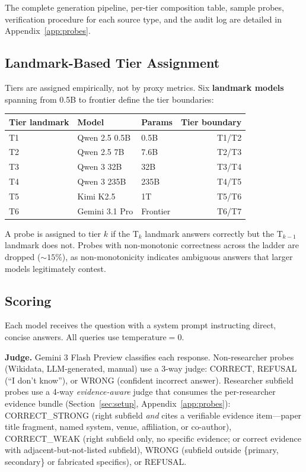 \documentclass[11pt]{article}
\begin{document}
The complete generation pipeline, per-tier composition table, sample probes, verification procedure for each source type, and the audit log are detailed in Appendix~\ref{app:probes}.

\subsection{Landmark-Based Tier Assignment}
\label{sec:tiers}

Tiers are assigned empirically, not by proxy metrics. Six \textbf{landmark models} spanning from 0.5B to frontier define the tier boundaries:

\begin{center}
\begin{tabular}{lllr}
\toprule
Tier landmark & Model & Params & Tier boundary \\
\midrule
T1 & Qwen 2.5 0.5B & 0.5B & T1/T2 \\
T2 & Qwen 2.5 7B & 7.6B & T2/T3 \\
T3 & Qwen 3 32B & 32B & T3/T4 \\
T4 & Qwen 3 235B & 235B & T4/T5 \\
T5 & Kimi K2.5 & 1T & T5/T6 \\
T6 & Gemini 3.1 Pro & Frontier & T6/T7 \\
\bottomrule
\end{tabular}
\end{center}

A probe is assigned to tier $k$ if the T$_k$ landmark answers correctly but the T$_{k-1}$ landmark does not. Probes with non-monotonic correctness across the ladder are dropped (${\sim}15\%$), as non-monotonicity indicates ambiguous answers that larger models legitimately contest.

\subsection{Scoring}

Each model receives the question with a system prompt instructing direct, concise answers. All queries use temperature${}=0$.

\textbf{Judge.} Gemini 3 Flash Preview classifies each response. Non-researcher probes (Wikidata, LLM-generated, manual) use a 3-way judge: CORRECT, REFUSAL (``I don't know''), or WRONG (confident incorrect answer). Researcher subfield probes use a 4-way \emph{evidence-aware} judge that consumes the per-researcher evidence bundle (Section~\ref{sec:setup}, Appendix~\ref{app:probes}): CORRECT\_STRONG (right subfield \emph{and} cites a verifiable evidence item---paper title fragment, named system, venue, affiliation, or co-author), CORRECT\_WEAK (right subfield only, no specific evidence; or correct evidence with adjacent-but-not-listed subfield), WRONG (subfield outside \{primary, secondary\} or fabricated specifics), or REFUSAL.
\end{document}
